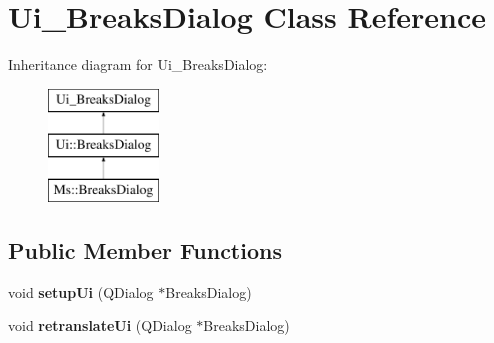 \hypertarget{class_ui___breaks_dialog}{}\section{Ui\+\_\+\+Breaks\+Dialog Class Reference}
\label{class_ui___breaks_dialog}
Inheritance diagram for Ui\+\_\+\+Breaks\+Dialog\+:\begin{figure}[H]
\begin{center}
\leavevmode
\includegraphics[height=3.000000cm]{class_ui___breaks_dialog}
\end{center}
\end{figure}
\subsection*{Public Member Functions}
\begin{DoxyCompactItemize}
\item 
\mbox{\label{class_ui___breaks_dialog_a7eef3abd07f5cedb1d5e2e57ab798549}} 
void {\bfseries setup\+Ui} (Q\+Dialog $\ast$Breaks\+Dialog)
\item 
\mbox{\label{class_ui___breaks_dialog_ae323e9d1628d2f0f3d5e83f4d095656d}} 
void {\bfseries retranslate\+Ui} (Q\+Dialog $\ast$Breaks\+Dialog)
\end{DoxyCompactItemize}
